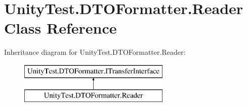 \hypertarget{class_unity_test_1_1_d_t_o_formatter_1_1_reader}{}\section{Unity\+Test.\+D\+T\+O\+Formatter.\+Reader Class Reference}
\label{class_unity_test_1_1_d_t_o_formatter_1_1_reader}
Inheritance diagram for Unity\+Test.\+D\+T\+O\+Formatter.\+Reader\+:\begin{figure}[H]
\begin{center}
\leavevmode
\includegraphics[height=2.000000cm]{class_unity_test_1_1_d_t_o_formatter_1_1_reader}
\end{center}
\end{figure}
